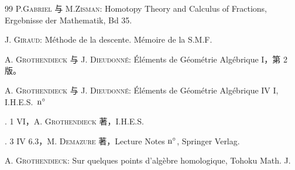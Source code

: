 \begin{thebibliography}{99}\pageoriginale
{} P.\textsc{Gabriel} 与 M.\textsc{Zisman}: Homotopy Theory
  and Calculus of Fractions, Ergebnisse der Mathematik, Bd 35.

 J. \textsc{Giraud}: M\'ethode de la descente. M\'emoire de la S.M.F.

 A. \textsc{Grothendieck} 与 J. \textsc{Dieudonn\'e}: \'El\'ements de
  G\'eom\'etrie Alg\'ebrique I，第 2 版。

 A. \textsc{Grothendieck} 与 J. \textsc{Dieudonn\'e}: \'El\'ements de
  G\'eom\'etrie Alg\'ebrique IV I, I.H.E.S.~${\rm n^{\circ}}$

 \SGA. 1 VI，A. \textsc{Grothendieck} 著，I.H.E.S.

 \SGA. 3 IV 6.3，M. \textsc{Demazure} 著，Lecture Notes
  ${\rm n^{\circ}}$, Springer Verlag.

 A. \textsc{Grothendieck}: Sur quelques points d'alg\`ebre
  homologique, Tohoku Math. J.
\end{thebibliography}

\ifx\danslelivre\undefined

\fi



